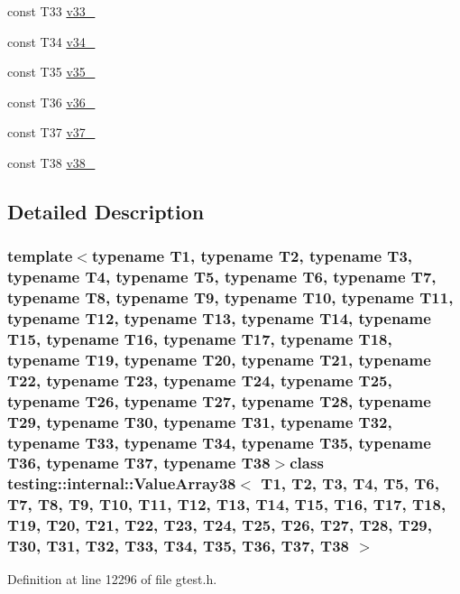 \begin{DoxyCompactItemize}
\item 
const \-T33 \hyperlink{classtesting_1_1internal_1_1ValueArray38_a7a6cefe370b709c3a7b35b6d5ca8c778}{v33\-\_\-}
\item 
const \-T34 \hyperlink{classtesting_1_1internal_1_1ValueArray38_ab379e4d515d66bc57e05267515fab1d9}{v34\-\_\-}
\item 
const \-T35 \hyperlink{classtesting_1_1internal_1_1ValueArray38_a0a36112ac9b7a13572874977627ed192}{v35\-\_\-}
\item 
const \-T36 \hyperlink{classtesting_1_1internal_1_1ValueArray38_a531a52e3e8de6e982edd23c2547e4c49}{v36\-\_\-}
\item 
const \-T37 \hyperlink{classtesting_1_1internal_1_1ValueArray38_a2c4a91368c3edf933948acb4996a833d}{v37\-\_\-}
\item 
const \-T38 \hyperlink{classtesting_1_1internal_1_1ValueArray38_a364bf323d933a4adac3a9b46952ae1d3}{v38\-\_\-}
\end{DoxyCompactItemize}


\subsection{\-Detailed \-Description}
\subsubsection*{template$<$typename T1, typename T2, typename T3, typename T4, typename T5, typename T6, typename T7, typename T8, typename T9, typename T10, typename T11, typename T12, typename T13, typename T14, typename T15, typename T16, typename T17, typename T18, typename T19, typename T20, typename T21, typename T22, typename T23, typename T24, typename T25, typename T26, typename T27, typename T28, typename T29, typename T30, typename T31, typename T32, typename T33, typename T34, typename T35, typename T36, typename T37, typename T38$>$class testing\-::internal\-::\-Value\-Array38$<$ T1, T2, T3, T4, T5, T6, T7, T8, T9, T10, T11, T12, T13, T14, T15, T16, T17, T18, T19, T20, T21, T22, T23, T24, T25, T26, T27, T28, T29, T30, T31, T32, T33, T34, T35, T36, T37, T38 $>$}



\-Definition at line 12296 of file gtest.\-h.



